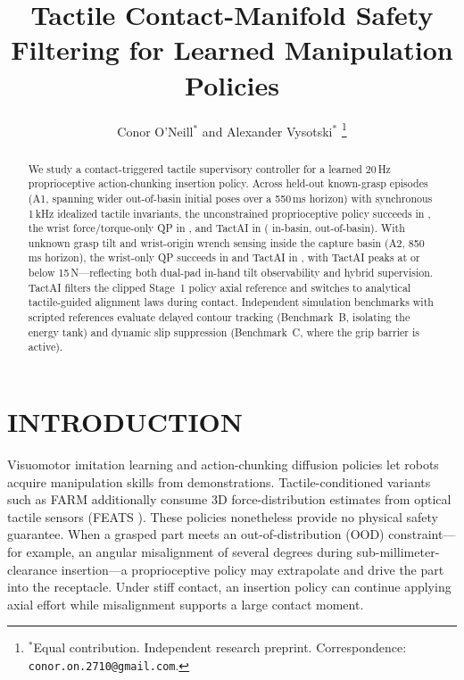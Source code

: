 \documentclass[letterpaper,10pt,conference]{IEEEtran}
\title{Tactile Contact-Manifold Safety Filtering for Learned Manipulation Policies}
\author{Conor O'Neill$^{*}$ and Alexander Vysotski$^{*}$%
\thanks{$^{*}$Equal contribution. Independent research preprint. Correspondence: {\tt\small conor.on.2710@gmail.com}.}%
}
\begin{document}
\raggedbottom

\maketitle
\thispagestyle{empty}
\pagestyle{empty}

\begin{abstract}
We study a contact-triggered tactile supervisory controller for a learned 20\,Hz proprioceptive action-chunking insertion policy. Across \HeldN{} held-out known-grasp episodes (A1, spanning wider out-of-basin initial poses over a 550\,ms horizon) with synchronous 1\,kHz idealized tactile invariants, the unconstrained proprioceptive policy succeeds in \UnconstrainedSuccess{}, the wrist force/torque-only QP in \FTSuccess{}, and TactAI in \HeldSuccess{} (\HeldInBasin{} in-basin, \HeldOutBasin{} out-of-basin). With unknown grasp tilt and wrist-origin wrench sensing inside the capture basin (A2, 850\,ms horizon), the wrist-only QP succeeds in \UnknownFT{} and TactAI in \UnknownSuccess{}, with \UnknownSafe{} TactAI peaks at or below 15\,N---reflecting both dual-pad in-hand tilt observability and hybrid supervision. TactAI filters the clipped Stage~1 policy axial reference and switches to analytical tactile-guided alignment laws during contact. Independent simulation benchmarks with scripted references evaluate delayed contour tracking (Benchmark~B, isolating the energy tank) and dynamic slip suppression (Benchmark~C, where the grip barrier is active).
\end{abstract}

\section{INTRODUCTION}

Visuomotor imitation learning and action-chunking diffusion policies \cite{chi2023diffusion,zhao2023act} let robots acquire manipulation skills from demonstrations. Tactile-conditioned variants such as FARM \cite{helmut2025farm} additionally consume 3D force-distribution estimates from optical tactile sensors (FEATS \cite{helmut2024feats}). These policies nonetheless provide no physical safety guarantee. When a grasped part meets an out-of-distribution (OOD) constraint---for example, an angular misalignment of several degrees during sub-millimeter-clearance insertion---a proprioceptive policy may extrapolate and drive the part into the receptacle. Under stiff contact, an insertion policy can continue applying axial effort while misalignment supports a large contact moment.
\end{document}
